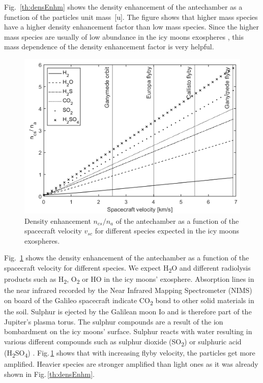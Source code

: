 	Fig.~\ref{th:densEnhm} shows the density enhancement of the antechamber as a function of the particles unit mass~[u]. The figure shows that higher mass species have a higher density enhancement factor than low mass species. Since the higher mass species are usually of low abundance in the icy moons exospheres \cite{Vorburger2015,Vorburger_2018}, this mass dependence of the density enhancement factor is very helpful.

	\begin{figure}[H] %
		\centering
		\includegraphics[width= .7\textwidth]{Bilder/velocityV1.png}
		\caption{Density enhancement $n_{cs}/n_a$ of the antechamber as a function of the spacecraft velocity $v_{sc}$ for different species expected in the icy moons exospheres.}
		\label{th:densEnhvelo}
	\end{figure}
	Fig.~\ref{th:densEnhvelo} shows the density enhancement of the antechamber as a function of the spacecraft velocity for different species. We expect H\textsubscript{2}O and different radiolysis products such as H\textsubscript{2}, O\textsubscript{2} or HO in the icy moons' exosphere. Absorption lines in the near infrared recorded by the Near Infrared Mapping Spectrometer (NIMS) on board of the Galileo spacecraft indicate CO\textsubscript{2} bond to other solid materials in the soil. Sulphur is ejected by the Galilean moon Io and is therefore part of the Jupiter's plasma torus. The sulphur compounds are a result of the ion bombardment on the icy moons' surface. Sulphur reacts with water resulting in various different compounds such as sulphur dioxide (SO\textsubscript{2}) or sulphuric acid (H\textsubscript{2}SO\textsubscript{4}) \cite{Collins_2014}. Fig.\,\ref{th:densEnhvelo} shows that with increasing flyby velocity, the particles get more amplified. Heavier species are stronger amplified than light ones as it was already shown in Fig.\,\ref{th:densEnhm}.\\
